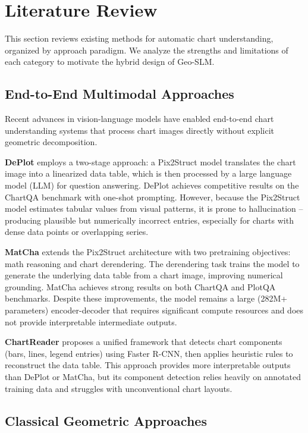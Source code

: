 \section{Literature Review}

This section reviews existing methods for automatic chart understanding, organized by
approach paradigm. We analyze the strengths and limitations of each category to motivate
the hybrid design of Geo-SLM.

\subsection{End-to-End Multimodal Approaches}

Recent advances in vision-language models have enabled end-to-end chart understanding
systems that process chart images directly without explicit geometric decomposition.

\textbf{DePlot} \cite{liu2023deplot} employs a two-stage approach: a Pix2Struct model
translates the chart image into a linearized data table, which is then processed by a
large language model (LLM) for question answering. DePlot achieves competitive results
on the ChartQA benchmark \cite{masry2022chartqa} with one-shot prompting. However,
because the Pix2Struct model estimates tabular values from visual patterns, it is prone
to hallucination -- producing plausible but numerically incorrect entries, especially
for charts with dense data points or overlapping series.

\textbf{MatCha} \cite{lee2023matcha} extends the Pix2Struct architecture with two
pretraining objectives: math reasoning and chart derendering. The derendering task trains
the model to generate the underlying data table from a chart image, improving numerical
grounding. MatCha achieves strong results on both ChartQA and PlotQA \cite{methani2020plotqa}
benchmarks. Despite these improvements, the model remains a large (282M+ parameters)
encoder-decoder that requires significant compute resources and does not provide
interpretable intermediate outputs.

\textbf{ChartReader} \cite{chen2022chartreader} proposes a unified framework that
detects chart components (bars, lines, legend entries) using Faster R-CNN, then applies
heuristic rules to reconstruct the data table. This approach provides more interpretable
outputs than DePlot or MatCha, but its component detection relies heavily on annotated
training data and struggles with unconventional chart layouts.

\subsection{Classical Geometric Approaches}

